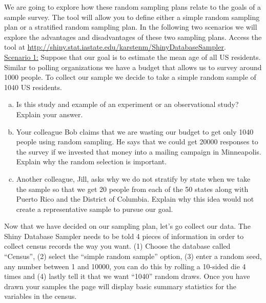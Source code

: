 \documentclass{article}\usepackage[]{graphicx}\usepackage[]{color}
\begin{document}
We are going to explore how these random sampling plans relate to the goals of a sample survey. The tool will allow you to define either a simple random sampling plan or a stratified random sampling plan. In the following two scenarios we will explore the advantages and disadvantages of these two sampling plans. Access the tool at \url{http://shiny.stat.iastate.edu/karstenm/ShinyDatabaseSampler}. \\	 

\underline{Scenario 1:} Suppose that our goal is to estimate the mean age of all US residents. Similar to polling organizations we have a budget that allows us to survey around 1000 people. To collect our sample we decide to take a simple random sample of 1040 US residents. \\

\begin{enumerate}[(a)]
\item Is this study and example of an experiment or an observational study?  Explain your answer.
\item	Your colleague Bob claims that we are wasting our budget to get only 1040 people using random sampling. He says that we could get 20000 responses to the survey if we invested that money into a mailing campaign in Minneapolis. Explain why the random selection is important.
\item	Another colleague, Jill, asks why we do not stratify by state when we take the sample so that we get 20 people from each of the 50 states along with Puerto Rico and the District of Columbia. Explain why this idea would not create a representative sample to pursue our goal.
\end{enumerate}

Now that we have decided on our sampling plan, let's go collect our data.  The Shiny Database Sampler needs to be told 4 pieces of information in order to collect census records the way you want. (1) Choose the database called ``Census'', (2) select the ``simple random sample'' option, (3) enter a random seed, any number between 1 and 10000, you can do this by rolling a 10-sided die 4 times and (4) lastly tell it that we want ``1040'' random draws. Once you have drawn your samples the page will display basic summary statistics for the variables in the census.\\
\end{document}
